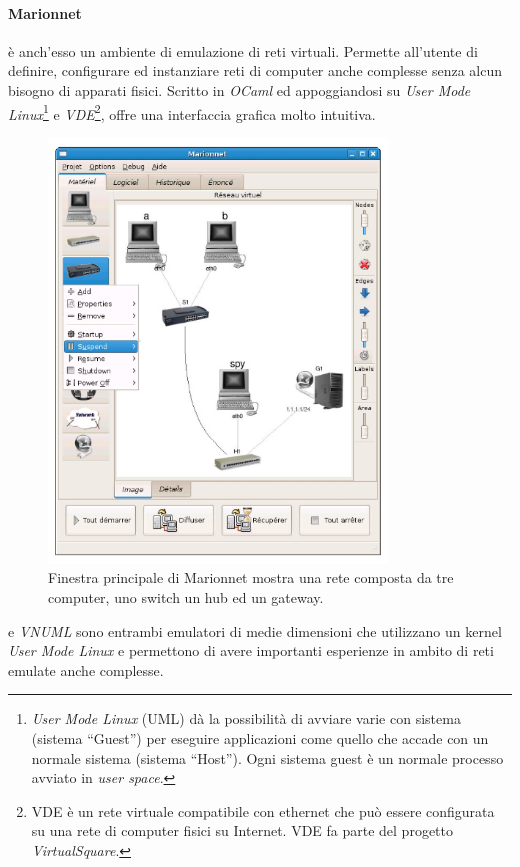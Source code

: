 \paragraph{Marionnet}\cite{MVNL08} è anch'esso un ambiente di emulazione di reti virtuali. Permette all'utente di definire, configurare ed instanziare reti di computer anche complesse senza alcun bisogno di apparati fisici. Scritto in \textit{OCaml} ed appoggiandosi su \emph{User Mode Linux}\footnote{\emph{User Mode Linux} (UML) dà la possibilità di avviare varie \virtualmachine{} con sistema \linux{} (sistema ``Guest'') per eseguire applicazioni come quello che accade con un normale sistema \linux{} (sistema ``Host''). Ogni sistema guest è un normale processo avviato in \emph{user space}.} e \textit{VDE}\footnote{VDE è un  rete virtuale compatibile con ethernet che può essere configurata su una rete di computer fisici su Internet. VDE fa parte del progetto \textit{VirtualSquare}.}, offre una interfaccia grafica molto intuitiva.
\begin{figure}[!ht]
	\centering
	\includegraphics[width=9cm]{images/marionnet_gui.png}
	\caption{Finestra principale di Marionnet mostra una rete composta da tre computer, uno switch un hub ed un gateway.}
	\label{figura:marionnet_gui}
\end{figure}

\netkit{}\cite{NETKIT}  e \emph{VNUML}\cite{VNUMLT} sono entrambi emulatori di medie dimensioni che utilizzano un kernel \emph{User Mode Linux} e permettono di avere importanti esperienze in ambito di reti emulate anche complesse.

